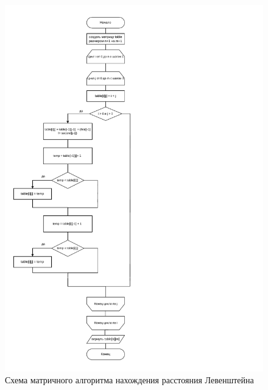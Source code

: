 \begin{figure}[h!]
	\centering
	\includegraphics[height=0.8\textheight]{tex_parts/scheme3.pdf}
	\caption{\label{fig:levItr}Схема матричного алгоритма нахождения расстояния Левенштейна}
\end{figure}

\clearpage


